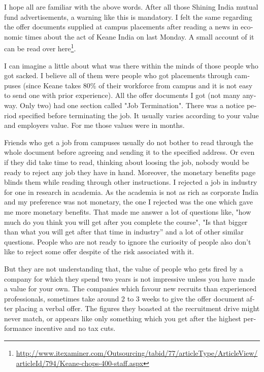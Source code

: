 \begin{english}
\vskip 2pt

I hope all are familiar with the above words. After all those Shining India mutual fund advertisements, a warning like this is mandatory. I felt the same regarding the offer documents supplied at campus placements after reading a news in economic times about the act of Keane India on last Monday. A small account of it can be read over here\footnote{\url{http://www.itexaminer.com/Outsourcing/tabid/77/articleType/ArticleView/articleId/794/Keane-chops-400-staff.aspx}}.

I can imagine a little about what was there within the minds of those people who got sacked. I believe all of them were people who got placements through campuses (since Keane takes 80\% of their workforce from campus and it is not easy to send one with prior experience). All the offer documents I got (not many anyway. Only two) had one section called "Job Termination". There was a notice period specified before terminating the job. It usually varies according to your value and employers value. For me those values were in months.

Friends who get a job from campuses usually do not bother to read through the whole document before agreeing and sending it to the specified address. Or even if they did take time to read, thinking about loosing the job, nobody would be ready to reject any job they have in hand. Moreover, the monetary benefits page blinds them while reading through other instructions. I rejected a job in industry for one in research in academia. As the academia is not as rich as corporate India and my preference was not monetary, the one I rejected was the one which gave me more monetary benefits. That made me answer a lot of questions like, "how much do you think you will get after you complete the course", "Is that bigger than what you will get after that time in industry'' and a lot of other similar questions. People who are not ready to ignore the curiosity of people also don’t like to reject some offer despite of the risk associated with it.

But they are not understanding that, the value of people who gets fired by a company for which they spend two years is not impressive unless you have made a value for your own. The companies which favour new recruits than experienced professionals, sometimes take around 2 to 3 weeks to give the offer document after placing a verbal offer. The figures they boasted at the recruitment drive might never match, or appears like only something which you get after the highest performance incentive and no tax cuts. 


\end{english}
